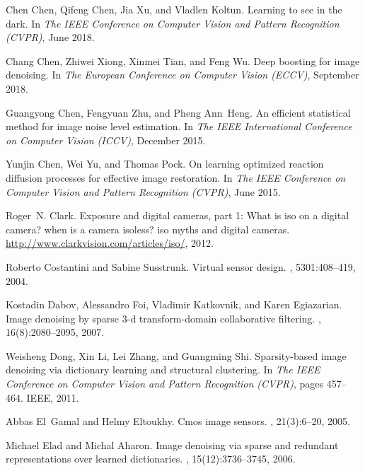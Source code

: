 \documentclass[10pt,twocolumn,letterpaper]{article}
\begin{document}
\begin{thebibliography}{10}
Chen Chen, Qifeng Chen, Jia Xu, and Vladlen Koltun.
\newblock Learning to see in the dark.
\newblock In {\em The IEEE Conference on Computer Vision and Pattern
  Recognition (CVPR)}, June 2018.

Chang Chen, Zhiwei Xiong, Xinmei Tian, and Feng Wu.
\newblock Deep boosting for image denoising.
\newblock In {\em The European Conference on Computer Vision (ECCV)}, September
  2018.

Guangyong Chen, Fengyuan Zhu, and Pheng Ann~Heng.
\newblock An efficient statistical method for image noise level estimation.
\newblock In {\em The IEEE International Conference on Computer Vision (ICCV)},
  December 2015.

Yunjin Chen, Wei Yu, and Thomas Pock.
\newblock On learning optimized reaction diffusion processes for effective
  image restoration.
\newblock In {\em The IEEE Conference on Computer Vision and Pattern
  Recognition (CVPR)}, June 2015.

Roger~N. Clark.
\newblock Exposure and digital cameras, part 1: What is iso on a digital
  camera? when is a camera isoless? iso myths and digital cameras.
\newblock \url{http://www.clarkvision.com/articles/iso/}, 2012.

Roberto Costantini and Sabine Susstrunk.
\newblock Virtual sensor design.
, 5301:408--419, 2004.

Kostadin Dabov, Alessandro Foi, Vladimir Katkovnik, and Karen Egiazarian.
\newblock Image denoising by sparse 3-d transform-domain collaborative
  filtering.
, 16(8):2080--2095, 2007.

Weisheng Dong, Xin Li, Lei Zhang, and Guangming Shi.
\newblock Sparsity-based image denoising via dictionary learning and structural
  clustering.
\newblock In {\em The IEEE Conference on Computer Vision and Pattern
  Recognition (CVPR)}, pages 457--464. IEEE, 2011.

Abbas El~Gamal and Helmy Eltoukhy.
\newblock Cmos image sensors.
, 21(3):6--20, 2005.

Michael Elad and Michal Aharon.
\newblock Image denoising via sparse and redundant representations over learned
  dictionaries.
, 15(12):3736--3745, 2006.


\end{thebibliography}
\end{document}
